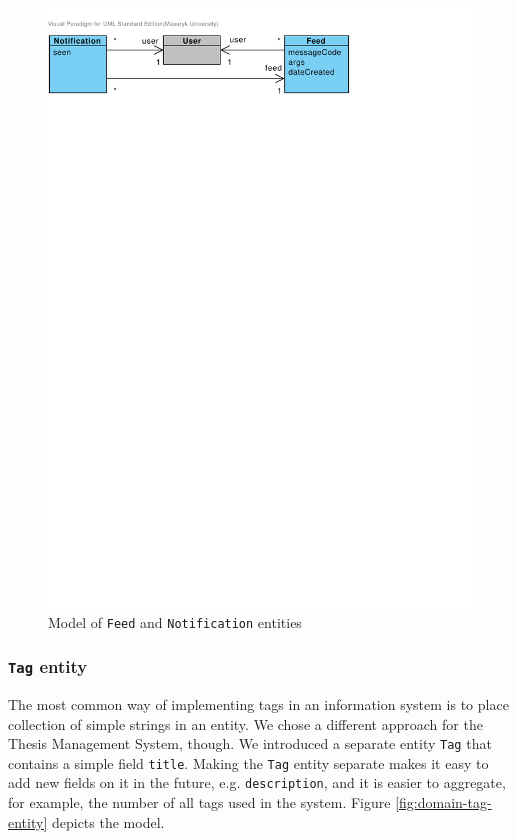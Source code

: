 \begin{figure}[h]
    \centering
        \includegraphics[trim=0 720 170 30, clip, keepaspectratio, width=\textwidth]{./images/domain-feed-notification-entities.pdf}
    \caption{Model of \texttt{Feed} and \texttt{Notification} entities}
    \label{fig:domain-feed-notification-entities}
\end{figure}

\subsubsection{\textbf{\texttt{Tag} entity}}

The most common way of implementing tags in an information system is to place collection of simple strings in an entity. We chose a different approach for the Thesis Management System, though. We introduced a separate entity \texttt{Tag} that contains a simple field \texttt{title}. Making the \texttt{Tag} entity separate makes it easy to add new fields on it in the future, e.g. \texttt{description}, and it is easier to aggregate, for example, the number of all tags used in the system. Figure \ref{fig:domain-tag-entity} depicts the model.

